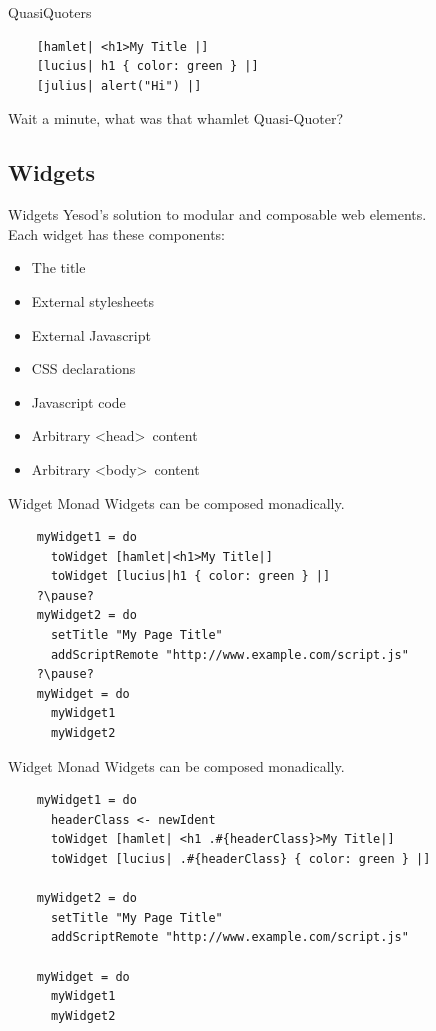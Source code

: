 \documentclass[pdf]{beamer}
\begin{document}
\begin{frame}[fragile]{QuasiQuoters}
  \begin{verbatim}
    [hamlet| <h1>My Title |]
    [lucius| h1 { color: green } |]
    [julius| alert("Hi") |]
  \end{verbatim}
  \pause
  Wait a minute, what was that whamlet Quasi-Quoter?
\end{frame}

\subsection{Widgets}
\begin{frame}{Widgets}
  Yesod's solution to modular and composable web elements. \\
  Each widget has these components:\\
  \begin{itemize}
  \item<1-> The title
  \item<2-> External stylesheets
  \item<2-> External Javascript
  \item<3-> CSS declarations
  \item<3-> Javascript code
  \item<4-> Arbitrary \textless head\textgreater\ content
  \item<4-> Arbitrary \textless body\textgreater\ content
  \end{itemize}
\end{frame}

\begin{frame}[fragile]{Widget Monad}
  Widgets can be composed monadically.
  \begin{verbatim}
    myWidget1 = do
      toWidget [hamlet|<h1>My Title|]
      toWidget [lucius|h1 { color: green } |]
    ?\pause?
    myWidget2 = do
      setTitle "My Page Title"
      addScriptRemote "http://www.example.com/script.js"
    ?\pause?
    myWidget = do
      myWidget1
      myWidget2
  \end{verbatim}
\end{frame}

\begin{frame}[fragile]{Widget Monad}
  Widgets can be composed monadically.
  \begin{verbatim}
    myWidget1 = do
      headerClass <- newIdent
      toWidget [hamlet| <h1 .#{headerClass}>My Title|]
      toWidget [lucius| .#{headerClass} { color: green } |]

    myWidget2 = do
      setTitle "My Page Title"
      addScriptRemote "http://www.example.com/script.js"

    myWidget = do
      myWidget1
      myWidget2
  \end{verbatim}
\end{frame}
\end{document}
